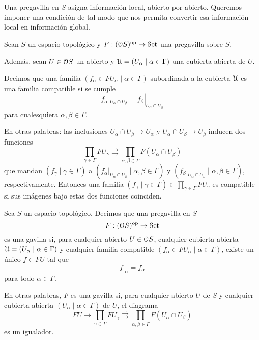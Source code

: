 Una pregavilla en $S$ asigna información local, abierto por abierto.
Queremos imponer una condición de tal modo que nos permita
convertir esa información local en información global.

\begin{definition}
    Sean $S$ un espacio topológico y $F:(\cal OS)^\op\to\Con$
    una pregavilla sobre $S$.
    
    Además, sean $U\in\cal OS$ un abierto y
    $\cal U = (U_\alpha\mid\alpha\in \Gamma)$
    una cubierta abierta de $U$.
    
    Decimos que una familia
    $(f_\alpha\in FU_\alpha\mid\alpha\in\Gamma)$
    subordinada a la cubierta $\cal U$
    es una familia compatible si se cumple
    \[
        f_\alpha|_{U_\alpha\cap U_\beta}
        =
        f_\beta|_{U_\alpha\cap U_\beta}
    \]
    para cualesquiera $\alpha,\beta\in\Gamma$.
    
    En otras palabras: las inclusiones
    $U_\alpha\cap U_\beta\to U_\alpha$
    y $U_\alpha\cap U_\beta\to U_\beta$ inducen
    dos funciones
    \[
        \prod_{\gamma\in\Gamma}FU_\gamma
        \rightrightarrows
        \prod_{\alpha,\beta\in\Gamma}F(U_\alpha\cap U_\beta)
    \]
    que mandan $(f_\gamma\mid\gamma\in\Gamma)$
    a $(f_\alpha|_{U_\alpha\cap U_\beta}\mid\alpha,\beta\in\Gamma)$
    y $(f_\beta|_{U_\alpha\cap U_\beta}\mid\alpha,\beta\in\Gamma)$,
    respectivamente.
    Entonces una familia
    $(f_\gamma\mid\gamma\in\Gamma)\in\prod_{\gamma\in\Gamma}FU_\gamma$
    es compatible si sus imágenes bajo estas dos funciones coinciden.
\end{definition}

\begin{definition}
    Sea $S$ un espacio topológico.
    Decimos que una pregavilla en $S$
    \[
        F:(\cal OS)^\op\to\Con
    \]
    es una gavilla si,
    para cualquier abierto $U\in\cal OS$, cualquier cubierta abierta
    $\cal U=(U_\alpha\mid \alpha\in\Gamma)$
    y cualquier familia compatible
    $(f_\alpha\in FU_\alpha\mid \alpha\in\Gamma)$,
    existe un único $f\in FU$ tal que
    \[
        f|_\alpha = f_\alpha
    \]
    para todo $\alpha\in\Gamma$.
    
    En otras palabras, $F$ es una gavilla si,
    para cualquier abierto $U$ de $S$ y
    cualquier cubierta abierta
    $(U_\alpha\mid\alpha\in\Gamma)$ de $U$,
    el diagrama
    \[
        FU
        \to
        \prod_{\gamma\in\Gamma} FU_\gamma
        \rightrightarrows
        \prod_{\alpha,\beta\in\Gamma}F(U_\alpha\cap U_\beta)
    \]
    es un igualador.
\end{definition}


